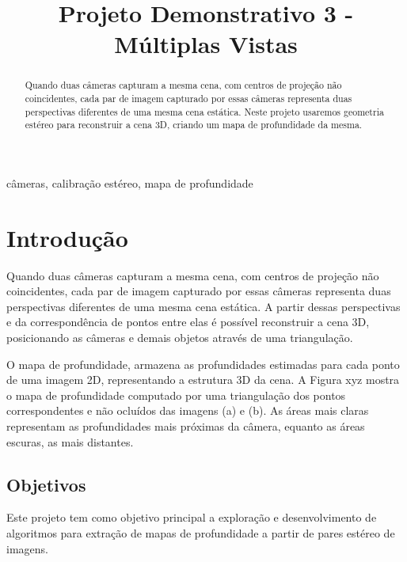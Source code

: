 \documentclass[conference]{IEEEtran}
\begin{document}
\title{Projeto Demonstrativo 3 - Múltiplas Vistas}

\author{
}

\maketitle

\begin{abstract}
Quando duas câmeras capturam a mesma cena, com centros de projeção não coincidentes, cada par de imagem capturado por essas câmeras representa duas perspectivas diferentes de uma mesma cena estática. Neste projeto usaremos geometria estéreo para reconstruir a cena 3D, criando um mapa de profundidade da mesma.
\end{abstract}

\begin{IEEEkeywords}
câmeras, calibração estéreo, mapa de profundidade
\end{IEEEkeywords}

\section{Introdução}
Quando duas câmeras capturam a mesma cena, com centros de projeção não coincidentes, cada par de imagem capturado por essas câmeras representa duas perspectivas diferentes de uma mesma cena estática. A partir dessas perspectivas e da correspondência de pontos entre elas é possível reconstruir a cena 3D, posicionando as câmeras e demais objetos através de uma triangulação.

O mapa de profundidade, armazena as profundidades estimadas para cada ponto de uma imagem 2D, representando a estrutura 3D da cena. A Figura {xyz} mostra o mapa de profundidade computado por uma triangulação dos pontos correspondentes e não ocluídos das imagens (a) e (b). As áreas mais claras representam as profundidades mais próximas da câmera, equanto as áreas escuras, as mais distantes.

\subsection{Objetivos}
Este projeto tem como objetivo principal a exploração e desenvolvimento de algoritmos para extração de mapas de profundidade a partir de pares estéreo de imagens.
\end{document}
